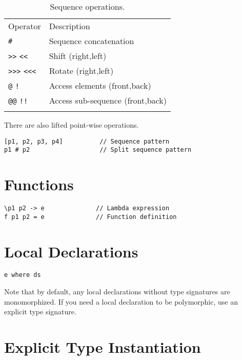 \begin{longtable}[c]{@{}ll@{}}
\toprule\addlinespace
Operator & Description
\\\addlinespace
\midrule\endhead
\texttt{\#} & Sequence concatenation
\\\addlinespace
\texttt{\textgreater{}\textgreater{}} \texttt{\textless{}\textless{}} &
Shift (right,left)
\\\addlinespace
\texttt{\textgreater{}\textgreater{}\textgreater{}}
\texttt{\textless{}\textless{}\textless{}} & Rotate (right,left)
\\\addlinespace
\texttt{@} \texttt{!} & Access elements (front,back)
\\\addlinespace
\texttt{@@} \texttt{!!} & Access sub-sequence (front,back)
\\\addlinespace
\bottomrule
\addlinespace
\caption{Sequence operations.}
\end{longtable}

There are also lifted point-wise operations.

\begin{verbatim}
[p1, p2, p3, p4]          // Sequence pattern
p1 # p2                   // Split sequence pattern
\end{verbatim}

\section{Functions}\label{functions}

\begin{verbatim}
\p1 p2 -> e              // Lambda expression
f p1 p2 = e              // Function definition
\end{verbatim}

\section{Local Declarations}\label{local-declarations}

\begin{verbatim}
e where ds
\end{verbatim}

Note that by default, any local declarations without type signatures
are monomorphized. If you need a local declaration to be polymorphic,
use an explicit type signature.

\section{Explicit Type Instantiation}\label{explicit-type-instantiation}

